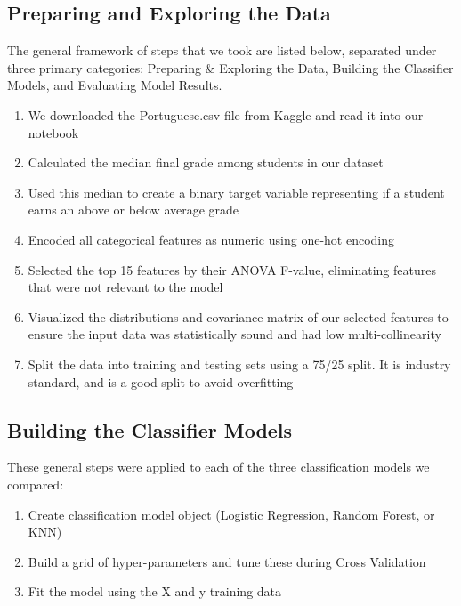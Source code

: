 \documentclass[twoside,twocolumn]{article}
\begin{document}
\subsection{Preparing and Exploring the Data}
The general framework of steps that we took are listed below, separated under three primary categories: Preparing \& Exploring the Data, Building the Classifier Models, and Evaluating Model Results. 
\begin{enumerate}
	\item We downloaded the Portuguese.csv file from Kaggle and read it into our notebook
	\item Calculated the median final grade among students in our dataset
	\item Used this median to create a binary target variable representing if a student earns an above or below average grade
	\item Encoded all categorical features as numeric using one-hot encoding 
	\item Selected the top 15 features by their ANOVA F-value, eliminating features that were not relevant to the model
	\item Visualized the distributions and covariance matrix of our selected features to ensure the input data was statistically sound and had low multi-collinearity
	\item Split the data into training and testing sets using a 75/25 split. It is industry standard, and is a good split to avoid overfitting
\end{enumerate}

\subsection{Building the Classifier Models}
These general steps were applied to each of the three classification models we compared:
\begin{enumerate}
	\item Create classification model object (Logistic Regression, Random Forest, or KNN)
	\item Build a grid of hyper-parameters and tune these during Cross Validation
	\item Fit the model using the X and y training data
\end {enumerate}
\end{document}
